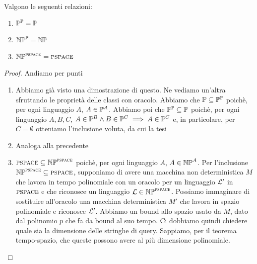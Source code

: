 \begin{thm}
    Valgono le seguenti relazioni:
    \begin{enumerate}
        \item $\mathbb{P}^{\mathbb{P}} = \mathbb{P}$
        \item $\mathbb{NP}^{\mathbb{P}} = \mathbb{NP}$
        \item $\mathbb{NP}^{\textsc{pspace}} = \textsc{pspace}$
    \end{enumerate}
\end{thm}
\begin{proof}
    Andiamo per punti
        \begin{enumerate}
                \item Abbiamo già visto una dimostrazione di questo. Ne vediamo un'altra sfruttando
                    le proprietà delle classi con oracolo. Abbiamo che $\mathbb{P} \subseteq
                    \mathbb{P}^{\mathbb{P}}$ poichè, per ogni linguaggio $A$, $A \in \mathbb{P}^{A}$.
                    Abbiamo poi che $\mathbb{P}^{\mathbb{P}} \subseteq \mathbb{P}$ poichè, per ogni
                    linguaggio $A,B,C$, $A \in \mathbb{P}^{B} \land B \in \mathbb{P}^{C} \implies A \in
                    \mathbb{P}^{C}$ e, in particolare, per $C = \emptyset$ otteniamo l'inclusione
                    voluta, da cui la tesi
                \item Analoga alla precedente
                \item $\textsc{pspace} \subseteq \mathbb{NP}^{\textsc{pspace}}$ poichè, per ogni linguaggio $A$, $A
                    \in \mathbb{NP}^{A}$. Per l'inclusione $\mathbb{NP}^{\textsc{pspace}} \subseteq \textsc{pspace}$,
                    supponiamo di avere una macchina non deterministica $M$ che lavora in tempo
                    polinomiale con un oracolo per un linguaggio $\mathcal{L}'$ in $\textsc{pspace}$ e che
                    riconosce un linguaggio $\mathcal{L} \in \mathbb{NP}^{\textsc{pspace}}$.  Possiamo immaginare di
                    sostituire all'oracolo una macchina deterministica $M'$ che lavora in spazio
                    polinomiale e riconosce $\mathcal{L}'$. Abbiamo un bound allo spazio usato da $M$,
                    dato dal polinomio $p$ che fa da bound al suo tempo.  Ci dobbiamo quindi
                    chiedere quale sia la dimensione delle stringhe di query.  Sappiamo, per il
                    teorema tempo-spazio, che queste possono avere al più dimensione polinomiale. 


\end{enumerate}
\end{proof}
